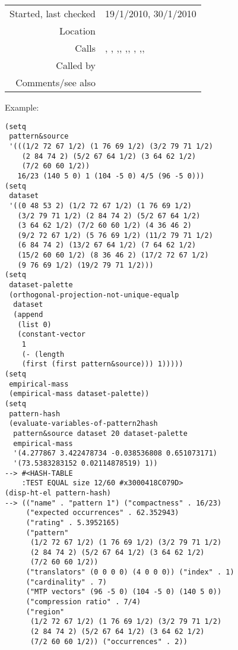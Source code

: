 \vspace{0.3cm}
\begin{tabular}{r|p{8cm}}
Started, last checked & 19/1/2010, 30/1/2010 \\
Location & \nameref{sec:evaluation-for-SIACT} \\
Calls & \nameref{fun:add-to-list}, \nameref{fun:choose}, \nameref{fun:coverage},\newline \nameref{fun:first-n-naturals}, \nameref{fun:index-item-1st-occurs},\newline \nameref{fun:likelihood-of-translations-reordered}, \nameref{fun:multiply-list-by-constant}, \nameref{fun:my-last},\newline \nameref{fun:nth-list}, \nameref{fun:translators-of-pattern-in-dataset} \\
Called by & \nameref{fun:evaluate-variables-of-patterns2hash} \\
Comments/see also &
\end{tabular}

\vspace{0.5cm}
\noindent Example:
\begin{verbatim}
(setq
 pattern&source
 '(((1/2 72 67 1/2) (1 76 69 1/2) (3/2 79 71 1/2)
    (2 84 74 2) (5/2 67 64 1/2) (3 64 62 1/2)
    (7/2 60 60 1/2))
   16/23 (140 5 0) 1 (104 -5 0) 4/5 (96 -5 0)))
(setq
 dataset
 '((0 48 53 2) (1/2 72 67 1/2) (1 76 69 1/2)
   (3/2 79 71 1/2) (2 84 74 2) (5/2 67 64 1/2) 
   (3 64 62 1/2) (7/2 60 60 1/2) (4 36 46 2)
   (9/2 72 67 1/2) (5 76 69 1/2) (11/2 79 71 1/2)
   (6 84 74 2) (13/2 67 64 1/2) (7 64 62 1/2)
   (15/2 60 60 1/2) (8 36 46 2) (17/2 72 67 1/2)
   (9 76 69 1/2) (19/2 79 71 1/2)))
(setq
 dataset-palette
 (orthogonal-projection-not-unique-equalp
  dataset
  (append
   (list 0)
   (constant-vector
    1
    (- (length
	(first (first pattern&source))) 1)))))
(setq
 empirical-mass
 (empirical-mass dataset-palette))
(setq
 pattern-hash
 (evaluate-variables-of-pattern2hash
  pattern&source dataset 20 dataset-palette
  empirical-mass
  '(4.277867 3.422478734 -0.038536808 0.651073171)
  '(73.5383283152 0.02114878519) 1))
--> #<HASH-TABLE
    :TEST EQUAL size 12/60 #x3000418C079D>
(disp-ht-el pattern-hash)
--> (("name" . "pattern 1") ("compactness" . 16/23)
     ("expected occurrences" . 62.352943)
     ("rating" . 5.3952165)
     ("pattern"
      (1/2 72 67 1/2) (1 76 69 1/2) (3/2 79 71 1/2)
      (2 84 74 2) (5/2 67 64 1/2) (3 64 62 1/2)
      (7/2 60 60 1/2))
     ("translators" (0 0 0 0) (4 0 0 0)) ("index" . 1)
     ("cardinality" . 7)
     ("MTP vectors" (96 -5 0) (104 -5 0) (140 5 0))
     ("compression ratio" . 7/4)
     ("region"
      (1/2 72 67 1/2) (1 76 69 1/2) (3/2 79 71 1/2)
      (2 84 74 2) (5/2 67 64 1/2) (3 64 62 1/2)
      (7/2 60 60 1/2)) ("occurrences" . 2))
\end{verbatim}

